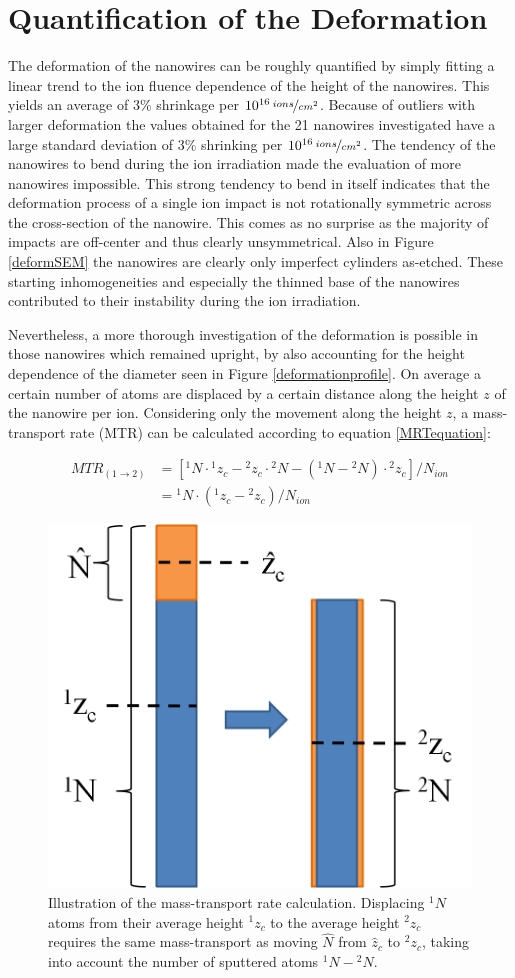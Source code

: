\section{Quantification of the Deformation}
\label{sec:quantifydeformation}

The deformation of the nanowires can be roughly quantified by simply fitting a linear trend to the ion fluence dependence of the height of the nanowires. This yields an average of $3\%$ shrinkage per $10^{16}\,\nicefrac{ions}{cm^2}$. Because of outliers with larger deformation the values obtained for the 21 nanowires investigated have a large standard deviation of $3\%$ shrinking per $10^{16}\,\nicefrac{ions}{cm^2}$. The tendency of the nanowires to bend during the ion irradiation made the evaluation of more nanowires impossible. This strong tendency to bend in itself indicates that the deformation process of a single ion impact is not rotationally symmetric across the cross-section of the nanowire. This comes as no surprise as the majority of impacts are off-center and thus clearly unsymmetrical. Also in Figure \ref{deformSEM} the nanowires are clearly only imperfect cylinders as-etched. These starting inhomogeneities and especially the thinned base of the nanowires contributed to their instability during the ion irradiation.

Nevertheless, a more thorough investigation of the deformation is possible in those nanowires which remained upright, by also accounting for the height dependence of the diameter seen in Figure \ref{deformationprofile}. On average a certain number of atoms are displaced by a certain distance along the height $z$ of the nanowire per ion. Considering only the movement along the height $z$, a mass-transport rate (MTR) can be calculated according to equation \ref{MRTequation}:

\begin{equation}  
\begin{split}
    MTR_{(1 \rightarrow 2)} & = [ {}^{1}N\cdot {}^{1}z_{c} -{}^{2}z_{c} \cdot {}^{2}N - ({}^{1}N - {}^{2}N) \cdot {}^{2}z_{c}]/N_{ion} \\
		& = {}^{1}N \cdot ({}^{1}z_{c} - {}^{2}z_{c})/N_{ion} 
	\label{MRTequation}
	\end{split}
\end{equation}

\begin{figure}
	\centering
		\includegraphics[width=.3\textwidth]{images/MTRillustration.png}
	\caption{Illustration of the mass-transport rate calculation. Displacing ${}^{1}N$ atoms from their average height ${}^{1}z_{c}$ to the average height ${}^{2}z_{c}$ requires the same mass-transport as moving $\hat{N}$ from $\hat{z}_c$ to ${}^{2}z_{c}$, taking into account the number of sputtered atoms ${}^{1}N-{}^{2}N$.}
	\label{MTRillustration}
\end{figure}

